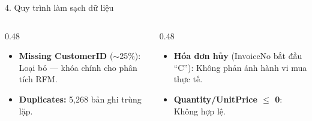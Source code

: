 \documentclass[10pt, aspectratio=169]{beamer}
\begin{document}
\begin{frame}{4. Quy trình làm sạch dữ liệu}
    \vspace{0.15cm}
    \begin{columns}[T]
        \begin{column}{0.48\textwidth}
            \begin{itemize}
                \item \textbf{Missing CustomerID} ($\sim$25\%): Loại bỏ --- khóa chính cho phân tích RFM.
                \item \textbf{Duplicates:} 5,268 bản ghi trùng lặp.
            \end{itemize}
        \end{column}
        \begin{column}{0.48\textwidth}
            \begin{itemize}
                \item \textbf{Hóa đơn hủy} (InvoiceNo bắt đầu ``C''): Không phản ánh hành vi mua thực tế.
                \item \textbf{Quantity/UnitPrice $\leq$ 0}: Không hợp lệ.
            \end{itemize}
        \end{column}
    \end{columns}
\end{frame}
\end{document}
